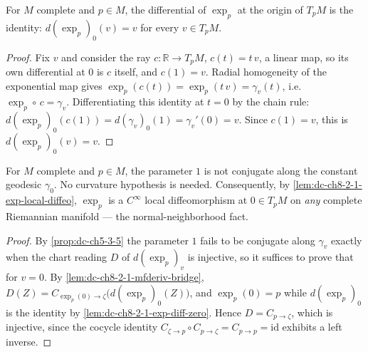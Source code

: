 \begin{lemma}
  \label{lem:dc-ch8-2-1-exp-diff-zero}
  \leanok
  For $M$ complete and $p\in M$, the differential of $\exp_p$ at the origin of $T_pM$ is the
  identity: $d(\exp_p)_0(v)=v$ for every $v\in T_pM$.
\end{lemma}
\begin{proof}
  \leanok
\sketch
  Fix $v$ and consider the ray $c:\mathbb R\to T_pM$, $c(t)=t\,v$, a linear map, so its own
  differential at $0$ is $c$ itself, and $c(1)=v$. Radial homogeneity of the exponential map gives
  $\exp_p(c(t))=\exp_p(t\,v)=\gamma_v(t)$, i.e. $\exp_p\circ\,c=\gamma_v$. Differentiating this
  identity at $t=0$ by the chain rule:
  $d(\exp_p)_0(c(1))=d(\gamma_v)_0(1)=\gamma_v'(0)=v$.
  Since $c(1)=v$, this is $d(\exp_p)_0(v)=v$.
\end{proof}

\begin{lemma}
  \label{lem:dc-ch8-2-1-no-conjugate-zero}
  \leanok
  For $M$ complete and $p\in M$, the parameter $1$ is not conjugate along the constant geodesic
  $\gamma_0$. No curvature hypothesis is needed. Consequently, by
  \cref{lem:dc-ch8-2-1-exp-local-diffeo}, $\exp_p$ is a $C^\infty$ local diffeomorphism at
  $0\in T_pM$ on \emph{any} complete Riemannian manifold --- the normal-neighborhood fact.

\end{lemma}
\begin{proof}
  \leanok
\sketch
  By \cref{prop:dc-ch5-3-5} the parameter $1$ fails to be conjugate along $\gamma_v$ exactly when
  the chart reading $D$ of $d(\exp_p)_v$ is injective, so it suffices to prove that for $v=0$. By
  \cref{lem:dc-ch8-2-1-mfderiv-bridge}, $D(Z)=C_{\exp_p(0)\to\zeta}\big(d(\exp_p)_0(Z)\big)$, and
  $\exp_p(0)=p$ while $d(\exp_p)_0$ is the identity by \cref{lem:dc-ch8-2-1-exp-diff-zero}. Hence
  $D=C_{p\to\zeta}$, which is injective, since the cocycle identity
  $C_{\zeta\to p}\circ C_{p\to\zeta}=C_{p\to p}=\mathrm{id}$ exhibits a left inverse.
\end{proof}

